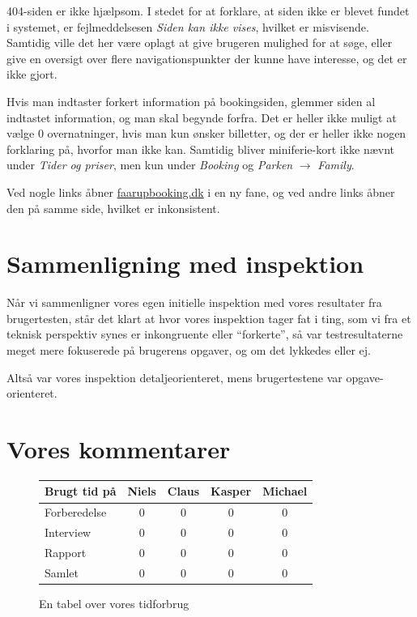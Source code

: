 \documentclass[10pt,a4paper]{article}      %
\begin{document}
404-siden er ikke hjælpsom. I stedet for at forklare, at siden ikke er
blevet fundet i systemet, er fejlmeddelsesen \emph{Siden kan ikke vises}, hvilket er
misvisende. Samtidig ville det her være oplagt at give brugeren mulighed for at
søge, eller give en oversigt over flere navigationspunkter der kunne have
interesse, og det er ikke gjort.

Hvis man indtaster forkert information på bookingsiden, glemmer siden al
indtastet information, og man skal begynde forfra. Det er heller ikke muligt at
vælge 0 overnatninger, hvis man kun ønsker billetter, og der er heller ikke
nogen forklaring på, hvorfor man ikke kan. Samtidig bliver miniferie-kort
ikke nævnt under \emph{Tider og priser}, men kun under \emph{Booking} og
\emph{Parken} $\rightarrow$ \emph{Family}.

Ved nogle links åbner \url{faarupbooking.dk} i en ny fane, og ved andre links
åbner den på samme side, hvilket er inkonsistent.

\section{Sammenligning med inspektion}
\label{apx:sammenligning-inspektion}

Når vi sammenligner vores egen initielle inspektion med vores resultater fra
brugertesten, står det klart at hvor vores inspektion tager fat i ting, som vi
fra et teknisk perspektiv synes er inkongruente eller ``forkerte'', så var
testresultaterne meget mere fokuserede på brugerens opgaver, og om det
lykkedes eller ej.

Altså var vores inspektion detaljeorienteret, mens brugertestene var
opgave-orienteret.
\section{Vores kommentarer}
\label{apx:vores-kommentarer}

\begin{figure}[htbp]
  \centering
  \begin{tabular}{lcccc}
    \toprule
    \textbf{Brugt tid på} & {Niels} & {Claus}  & {Kasper}  & {Michael} \\
    \midrule
    Forberedelse & 0 & 0 & 0 & 0 \\
    Interview & 0 & 0 & 0 & 0 \\
    Rapport & 0 & 0 & 0 & 0 \\
    \midrule
    Samlet & 0 & 0 & 0 & 0 \\
    \bottomrule
  \end{tabular}
  \caption{En tabel over vores tidforbrug}
  \label{tab:tidsforbrug}
\end{figure}
\end{document}
